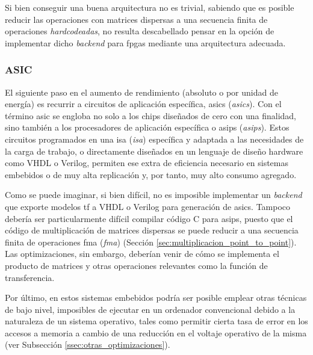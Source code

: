 Si bien conseguir una buena arquitectura no es trivial, sabiendo que es posible reducir las operaciones con matrices dispersas a una secuencia finita de operaciones \textit{hardcodeadas}, no resulta descabellado pensar en la opción de implementar dicho \textit{\gls{backend}} para \acrshort{fpga}s mediante una arquitectura adecuada.

\subsubsection{ASIC}
\label{sssec:heterogeneas_asic}
El siguiente paso en el aumento de rendimiento (absoluto o por unidad de energía) es recurrir a circuitos de aplicación específica, \acrshort{asic}s (\textit{\acrlong{asic}s}). Con el término \acrshort{asic} se engloba no solo a los chips diseñados de cero con una finalidad, sino también a los procesadores de aplicación específica o \acrshort{asip}s (\textit{\acrlong{asip}s}). Estos circuitos programados en una \acrshort{isa} (\textit{\acrlong{isa}}) específica y adaptada a las necesidades de la carga de trabajo, o directamente diseñados en un lenguaje de diseño hardware como VHDL o Verilog, permiten ese extra de eficiencia necesario en sistemas embebidos o de muy alta replicación y, por tanto, muy alto consumo agregado.

Como se puede imaginar, si bien difícil, no es imposible implementar un \textit{\gls{backend}} que exporte modelos \acrlong{tf} a VHDL o Verilog para generación de \acrshort{asic}s. Tampoco debería ser particularmente difícil compilar código C para \acrshort{asip}s, puesto que el código de multiplicación de matrices dispersas se puede reducir a una secuencia finita de operaciones \acrshort{fma} (\textit{\acrlong{fma}}) (Sección \ref{sec:multiplicacion_point_to_point}). Las optimizaciones, sin embargo, deberían venir de cómo se implementa el producto de matrices y otras operaciones relevantes como la función de transferencia.

Por último, en estos sistemas embebidos podría ser posible emplear otras técnicas de bajo nivel, imposibles de ejecutar en un ordenador convencional debido a la naturaleza de un sistema operativo, tales como permitir cierta tasa de error en los accesos a memoria a cambio de una reducción en el voltaje operativo de la misma (ver Subsección \ref{ssec:otras_optimizaciones}).